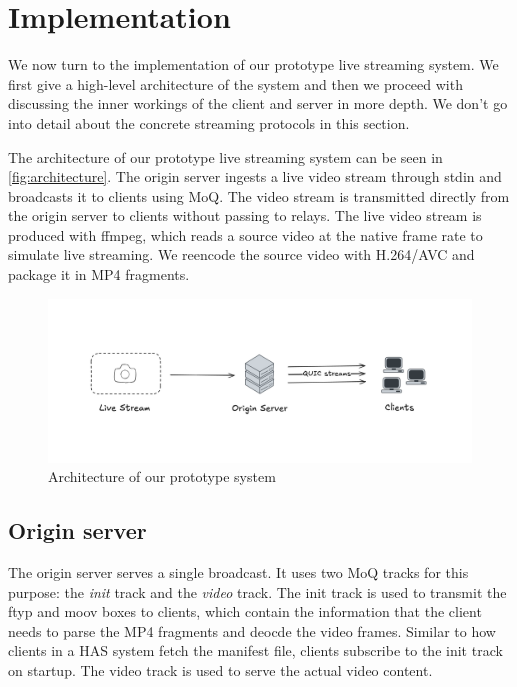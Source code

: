 
\chapter{Implementation}\label{chapter:implementation}
We now turn to the implementation of our prototype live streaming system. We first give a high-level architecture of the system and then we proceed with discussing the inner workings of the client and server in more depth. We don't go into detail about the concrete streaming protocols in this section. 

The architecture of our prototype live streaming system can be seen in \autoref{fig:architecture}. The origin server ingests a live video stream through stdin and broadcasts it to clients using \ac{MoQ}. The video stream is transmitted directly from the origin server to clients without passing to relays. The live video stream is produced with ffmpeg, which reads a source video at the native frame rate to simulate live streaming. We reencode the source video with H.264/AVC and package it in MP4 fragments.

\begin{figure}
    \centering
    \includegraphics[width=\textwidth]{figures/architecture.png}
    \caption{Architecture of our prototype system}
    \label{fig:architecture}
\end{figure}

\section{Origin server}
The origin server serves a single broadcast. It uses two \ac{MoQ} tracks for this purpose: the \textit{init} track and the \textit{video} track. The init track is used to transmit the ftyp and moov boxes to clients, which contain the information that the client needs to parse the MP4 fragments and deocde the video frames. Similar to how clients in a \ac{HAS} system fetch the manifest file, clients subscribe to the init track on startup. The video track is used to serve the actual video content.

